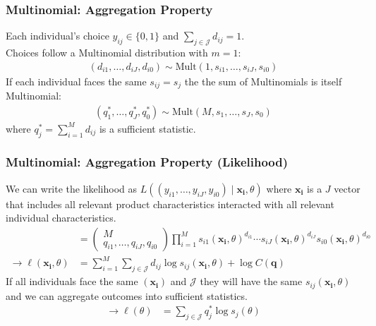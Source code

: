 \begin{frame}
\frametitle{Multinomial:  Aggregation Property}
Each individual's choice $y_{ij} \in\{0,1\}$ and $\sum_{j \in \mathcal{J}} d_{ij} =1$.\\

Choices follow a Multinomial distribution with $m=1$:
\begin{align*}
(d_{i1},\ldots,d_{iJ},d_{i0}) \sim \text{Mult} (1,s_{i1},\ldots,s_{iJ},s_{i0} ) 
\end{align*}
If each individual faces the same $s_{ij}=s_j$ the the sum of Multinomials is itself Multinomial:
\begin{align*}
(q_{1}^{*},\ldots,q_{J}^{*},q_{0}^{*}) \sim \text{Mult} (M, s_{1},\ldots,s_{J},s_{0} ) 
\end{align*}
where $q_{j}^{*}=\sum_{i=1}^M d_{ij}$ is a \alert{sufficient statistic}.
\end{frame}

\begin{frame}
\frametitle{Multinomial:  Aggregation Property (Likelihood)}
We can write the likelihood as $L\left((y_{i1},\ldots,y_{iJ},y_{i0})  \mid \mathbf{x_i},  \theta \right)$ where $\mathbf{x_i}$ is a $J$ vector that includes all relevant product characteristics interacted with all relevant individual characteristics.
\begin{align*}
&=
\left(\begin{array}{c}
M \\
q_{i1},\ldots, q_{iJ}, q_{i0}
\end{array}\right)
\prod_{i=1}^M s_{i1}(\mathbf{x_i},\theta)^{d_{i1}}\cdots s_{iJ}(\mathbf{x_i},\theta)^{d_{iJ}}  s_{i0}(\mathbf{x_i},\theta)^{d_{i0}}\\
\rightarrow \ell(\mathbf{x_i},\theta)&= \sum_{i=1}^M \sum_{j \in \mathcal{J}} d_{ij} \log s_{ij}(\mathbf{x_i},\theta) + \log C(\mathbf{q})
\end{align*}
If all individuals face the same $(\mathbf{x_i})$ and $\mathcal{J}$ they will have the same $s_{ij}(\mathbf{x_i},\theta)$ and we can aggregate outcomes into \alert{sufficient statistics}.
\begin{align*}
\rightarrow \ell(\theta) &=  \sum_{j \in \mathcal{J}} q_{j}^{*} \log s_{j}(\theta)
\end{align*}
\end{frame}

